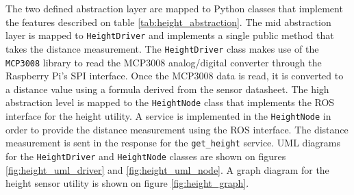 \documentclass{article}
\begin{document}
The two defined abstraction layer are mapped to Python classes that implement the features described on table \ref{tab:height_abstraction}. The mid abstraction layer is mapped to \texttt{HeightDriver} and implements a single public method that takes the distance measurement. The \texttt{HeightDriver} class makes use of the \texttt{MCP3008} library to read the MCP3008 analog/digital converter through the Raspberry Pi's SPI interface. Once the MCP3008 data is read, it is converted to a distance value using a formula derived from the sensor datasheet. The high abstraction level is mapped to the \texttt{HeightNode} class that implements the ROS interface for the height utility. A service is implemented in the \texttt{HeightNode} in order to provide the distance measurement using the ROS interface. The distance measurement is sent in the response for the \texttt{get\_height} service. UML diagrams for the \texttt{HeightDriver} and \texttt{HeightNode} classes are shown on figures \ref{fig:height_uml_driver} and \ref{fig:height_uml_node}. A graph diagram for the height sensor utility is shown on figure \ref{fig:height_graph}.
\end{document}
